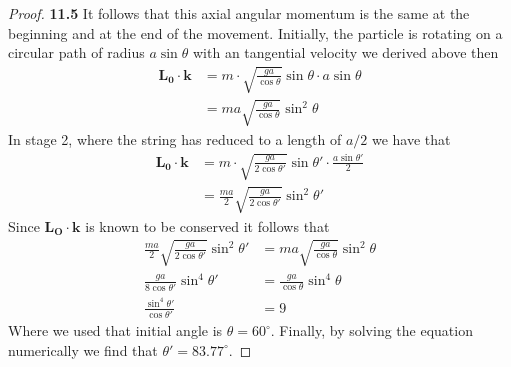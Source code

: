 \documentclass[11pt]{article}
\theoremstyle{definition}
\begin{document}
\begin{proof}{\textbf{11.5}}
    It follows that this axial angular momentum is the same at the beginning
    and at the end of the movement. Initially, the particle is rotating on a 
    circular path of radius $a \sin \theta$ with an tangential velocity we
    derived above then
    \begin{align*}
        \bm{L_0 \cdot k} &= m \cdot \sqrt{\frac{ga}{\cos\theta}} \sin\theta
            \cdot a \sin \theta\\
            &= ma \sqrt{\frac{ga}{\cos\theta}} \sin^2\theta
    \end{align*}
    In stage 2, where the string has reduced to a length of $a/2$ we have that
    \begin{align*}
        \bm{L_0 \cdot k} &= m \cdot \sqrt{\frac{ga}{2\cos\theta'}} \sin\theta'
        \cdot \frac{a \sin \theta'}{2}\\
        &= \frac{ma}{2} \sqrt{\frac{ga}{2\cos\theta'}} \sin^2\theta'
    \end{align*}
    Since $\bm{L_O} \cdot \bm{k}$ is known to be conserved it follows that
    \begin{align*}
        \frac{ma}{2} \sqrt{\frac{ga}{2\cos\theta'}} \sin^2\theta'
        &= ma \sqrt{\frac{ga}{\cos\theta}} \sin^2\theta\\
        \frac{ga}{8\cos\theta'} \sin^4\theta'
        &=\frac{ga}{\cos\theta} \sin^4\theta\\
        \frac{\sin^4\theta'}{\cos\theta'} &= 9
    \end{align*}
    Where we used that initial angle is $\theta = 60^\circ$. Finally, by
    solving the equation numerically we find that $\theta' = 83.77^\circ$.
\end{proof}
\cleardoublepage
\end{document}
